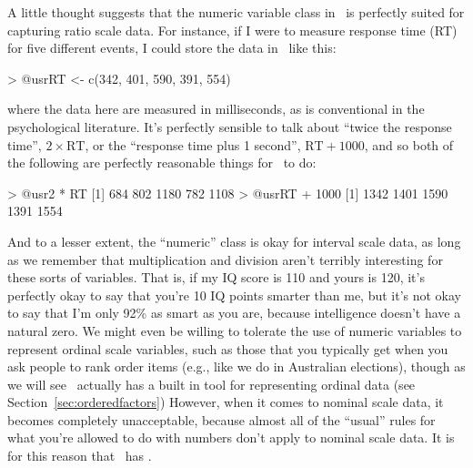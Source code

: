 A little thought suggests that the numeric variable class in \R\ is perfectly suited for capturing ratio scale data. For instance, if I were to measure response time (RT) for five different events, I could store the data in \R\ like this:
\begin{rblock1}
> @usr{RT <- c(342, 401, 590, 391, 554)}
\end{rblock1}
where the data here are measured in milliseconds, as is conventional in the psychological literature. It's perfectly sensible to talk about ``twice the response time'', $2 \times \mbox{RT}$, or the ``response time plus 1 second'', $\mbox{RT} + 1000$, and so both of the following are perfectly reasonable things for \R\ to do:
\begin{rblock1}
> @usr{2 * RT}
[1]  684  802 1180  782 1108
> @usr{RT + 1000}
[1] 1342 1401 1590 1391 1554
\end{rblock1} 
And to a lesser extent, the ``numeric'' class is okay for interval scale data, as long as we remember that multiplication and division aren't terribly interesting for these sorts of variables. That is, if my IQ score is 110 and yours is 120, it's perfectly okay to say that you're 10 IQ points smarter than me, but it's not okay to say that I'm only 92\% as smart as you are, because intelligence doesn't have a natural zero. We might even be willing to tolerate the use of numeric variables to represent ordinal scale variables, such as those that you typically get when you ask people to rank order items (e.g., like we do in Australian elections), though as we will see \R\ actually has a built in tool for representing ordinal data (see Section~\ref{sec:orderedfactors}) However, when it comes to nominal scale data, it becomes completely unacceptable, because almost all of the ``usual'' rules for what you're allowed to do with numbers don't apply to nominal scale data. It is for this reason that \R\ has . 




